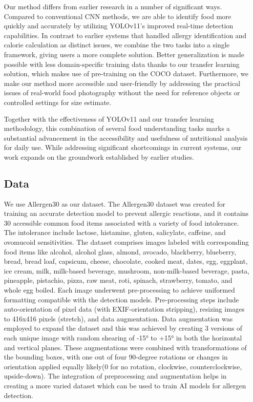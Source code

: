 \documentclass[10pt,twocolumn,letterpaper]{article}
\begin{document}
Our method differs from earlier research in a number of significant ways. Compared to conventional CNN methods, we are able to identify food more quickly and accurately by utilizing YOLOv11's\cite{redmon2016lookonceunifiedrealtime} improved real-time detection capabilities. 
In contrast to earlier systems that handled allergy identification and calorie calculation as distinct issues, we combine the two tasks into a single framework, giving users a more complete solution. 
Better generalization is made possible with less domain-specific training data thanks to our transfer learning solution, which makes use of pre-training on the COCO\cite{lin2015microsoftcococommonobjects} dataset. 
Furthermore, we make our method more accessible and user-friendly by addressing the practical issues of real-world food photography without the need for reference objects or controlled settings for size estimate.

Together with the effectiveness of YOLOv11 and our transfer learning methodology, this combination of several food understanding tasks marks a substantial advancement in the accessibility and usefulness of nutritional analysis for daily use. 
While addressing significant shortcomings in current systems, our work expands on the groundwork established by earlier studies.

\subsection{Data}

We use Allergen30 as our dataset. The Allergen30 dataset was created for training an accurate detection model to prevent allergic reactions, and it contains 30 accessible common food items associated with a variety of food intolerance. The intolerance include lactose, histamine, gluten, salicylate, caffeine, and ovomucoid sensitivities. The dataset comprises images labeled with corresponding food items like alcohol, alcohol glass, almond, avocado, blackberry, blueberry, bread, bread loaf, capsicum, cheese, chocolate, cooked meat, dates, egg, eggplant, ice cream, milk, milk-based beverage, mushroom, non-milk-based beverage, pasta, pineapple, pistachio, pizza, raw meat, roti, spinach, strawberry, tomato, and whole egg boiled. Each image underwent pre-processing to achieve uniformed formatting compatible with the detection models. Pre-processing steps include auto-orientation of pixel data (with EXIF-orientation stripping), resizing images to 416x416 pixels (stretch), and data augmentation. Data augmentation was employed to expand the dataset and this was achieved by creating 3 versions of each unique image with random shearing of -15° to +15° in both the horizontal and vertical planes. These augmentations were combined with transformations of the bounding boxes, with one out of four 90-degree rotations or changes in orientation applied equally likely(0 for no rotation, clockwise, counterclockwise, upside-down). The integration of preprocessing and augmentation helps in creating a more varied dataset which can be used to train AI models for allergen detection.
\end{document}
